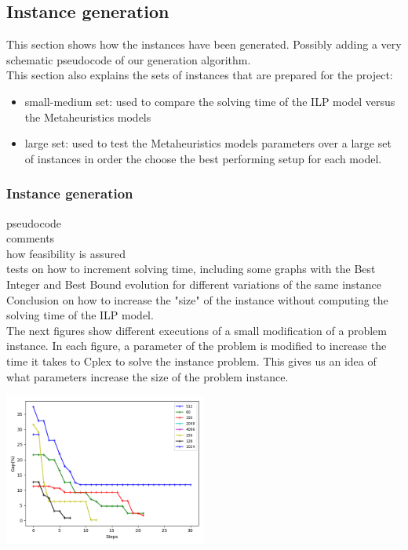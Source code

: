 \subsection{Instance generation}

This section shows how the instances have been generated. Possibly adding a very schematic pseudocode of our generation algorithm.\\

This section also explains the sets of instances that are prepared for the project:\\
\begin{itemize}
	\item small-medium set: used to compare the solving time of the ILP model versus the Metaheuristics models
	\item large set: used to test the Metaheuristics models parameters over a large set of instances in order the choose the best performing setup for each model.
\end{itemize} 

\subsubsection{Instance generation}

pseudocode\\
comments\\
how feasibility is assured\\
tests on how to increment solving time, including some graphs with the Best Integer and Best Bound evolution for different variations of the same instance\\
Conclusion on how to increase the "size" of the instance without computing the solving time of the ILP model.\\

The next figures show different executions of a small modification of a problem instance. In each figure, a parameter of the problem is modified to increase the time it takes to Cplex to solve the instance problem. This gives us an idea of what parameters increase the size of the problem instance.\\

\begin{center}
\includegraphics[width=0.5\textwidth]{./img/instances_nurses_ilp_evol.png}
\end{center}

